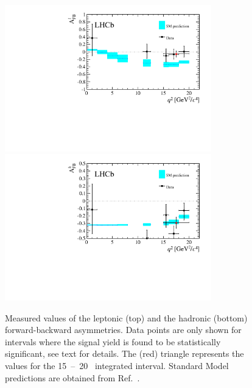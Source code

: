 \begin{figure}[ptb]
\centering
\includegraphics[width=0.8\textwidth]{Lmumu/figs/paper/figure8a.pdf}
\includegraphics[width=0.8\textwidth]{Lmumu/figs/paper/figure8b.pdf}
\caption{Measured values of the leptonic (top) and the hadronic (bottom)
  forward-backward asymmetries. Data points are only shown for \qsq intervals 
  where the signal yield is found to be statistically significant, see text for details.
  The (red) triangle represents the values for the \mbox{15 -- 20~\gevgevcccc}
  integrated \qsq interval. Standard Model predictions are obtained from Ref.~\cite{Meinel:2014wua}.}
\label{fig:Afb_results}
\end{figure}


